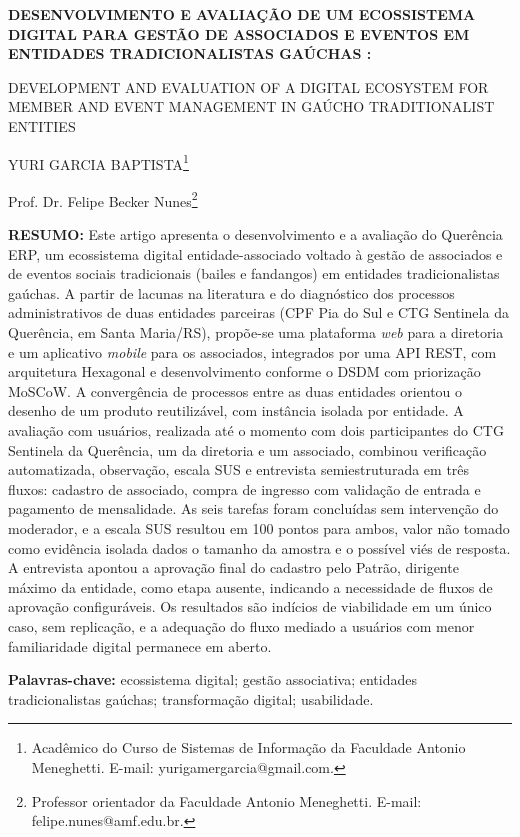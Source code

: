 \documentclass[12pt,a4paper]{article}
\makeatletter
\newcommand{\autor}{YURI GARCIA BAPTISTA}
\newcommand{\titulo}{DESENVOLVIMENTO E AVALIAÇÃO DE UM ECOSSISTEMA DIGITAL PARA GESTÃO DE ASSOCIADOS E EVENTOS EM ENTIDADES TRADICIONALISTAS GAÚCHAS}
\newcommand{\subtitulo}{}
\newcommand{\tituloestrangeiro}{DEVELOPMENT AND EVALUATION OF A DIGITAL ECOSYSTEM FOR MEMBER AND EVENT MANAGEMENT IN GAÚCHO TRADITIONALIST ENTITIES}
\newcommand{\orientador}{Prof. Dr. Felipe Becker Nunes}
\newcommand{\curriculoautor}{Acadêmico do Curso de Sistemas de Informação da Faculdade Antonio Meneghetti. E-mail: yurigamergarcia@gmail.com.}
\newcommand{\curriculoorientador}{Professor orientador da Faculdade Antonio Meneghetti. E-mail: felipe.nunes@amf.edu.br.}
\newcommand{\imprimirtitulo}{%
  \titulo%
  \if\relax\detokenize\expandafter{\subtitulo}\relax
  \else: \subtitulo\fi
}
\makeatother
\begin{document}
\begin{center}
  \bfseries\MakeUppercase{\imprimirtitulo}

  \vspace{1.5\baselineskip}
  \MakeUppercase{\tituloestrangeiro}

  \vspace{1.5\baselineskip}
  \normalfont
  \autor\footnote{\curriculoautor}

  \orientador\footnote{\curriculoorientador}
\end{center}

\vspace{\baselineskip}
\noindent\textbf{RESUMO:} Este artigo apresenta o desenvolvimento e a avaliação do Querência ERP, um
ecossistema digital entidade-associado voltado à gestão de associados e de eventos sociais
tradicionais (bailes e fandangos) em entidades tradicionalistas gaúchas. A partir de lacunas na
literatura e do diagnóstico dos processos administrativos de duas entidades parceiras (CPF Pia do Sul
e CTG Sentinela da Querência, em Santa Maria/RS), propõe-se uma plataforma \textit{web} para a
diretoria e um aplicativo \textit{mobile} para os associados, integrados por uma API REST, com
arquitetura Hexagonal e desenvolvimento conforme o DSDM com priorização MoSCoW. A convergência de
processos entre as duas entidades orientou o desenho de um produto reutilizável, com instância
isolada por entidade. A avaliação com usuários, realizada até o momento com dois participantes do CTG
Sentinela da Querência, um da diretoria e um associado, combinou verificação automatizada,
observação, escala SUS e entrevista semiestruturada em três fluxos: cadastro de associado, compra de
ingresso com validação de entrada e pagamento de mensalidade. As seis tarefas foram concluídas sem
intervenção do moderador, e a escala SUS resultou em 100 pontos para ambos, valor não tomado como
evidência isolada dados o tamanho da amostra e o possível viés de resposta. A entrevista apontou a
aprovação final do cadastro pelo Patrão, dirigente máximo da entidade, como etapa ausente, indicando a
necessidade de fluxos de aprovação configuráveis. Os resultados são indícios de viabilidade em um
único caso, sem replicação, e a adequação do fluxo mediado a usuários com menor familiaridade digital
permanece em aberto.

\vspace{\baselineskip}
\noindent\textbf{Palavras-chave:} ecossistema digital; gestão associativa; entidades tradicionalistas gaúchas; transformação digital; usabilidade.
\end{document}
